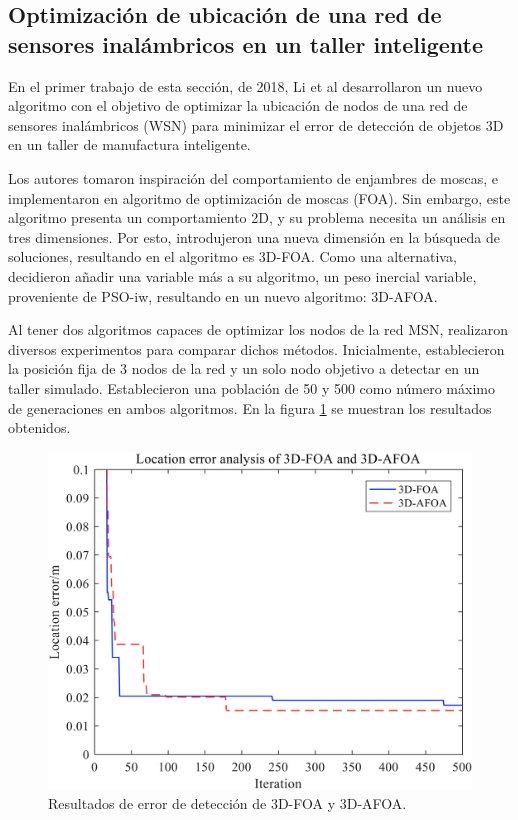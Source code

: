 \documentclass[letterpaper]{report}
\begin{document}
  \subsection{Optimización de ubicación de una red de sensores inalámbricos en
    un taller inteligente}
    En el primer trabajo de esta sección, de 2018, Li et al \cite{3DAFAO}
    desarrollaron un nuevo algoritmo con el
    objetivo de optimizar la ubicación de nodos de una red de sensores
    inalámbricos (WSN) para minimizar el error de detección de objetos 3D en un
    taller de manufactura inteligente.
    
    Los autores tomaron inspiración del comportamiento de enjambres de moscas,
    e implementaron en algoritmo de 
    optimización de moscas (FOA). Sin embargo, este algoritmo presenta un
    comportamiento 2D, y su problema necesita un análisis en tres dimensiones.
    Por esto, introdujeron una nueva dimensión en la búsqueda de soluciones,
    resultando en el algoritmo es 3D-FOA. Como una alternativa, decidieron
    añadir una variable más a su algoritmo, un peso inercial variable,
    proveniente de PSO-iw, resultando en un nuevo algoritmo: 3D-AFOA.

    Al tener dos algoritmos capaces de optimizar los nodos de la red MSN,
    realizaron diversos experimentos para comparar dichos métodos. Inicialmente,
    establecieron la posición fija de 3 nodos de la red y un solo nodo objetivo
    a detectar en un taller simulado. Establecieron una población de 50 y 500
    como número máximo de generaciones en ambos algoritmos. En la figura
    \ref{fig:location-error-3d-foa-3d-afoa_1} se muestran los resultados
    obtenidos.

    \begin{figure}[ht!]
      \includegraphics[width=\textwidth]{location-error-3d-foa-3d-afoa_1.png}
      \centering
      \caption{Resultados de error de detección de 3D-FOA y 3D-AFOA.}
      \label{fig:location-error-3d-foa-3d-afoa_1}
      \centering
    \end{figure}
\end{document}
